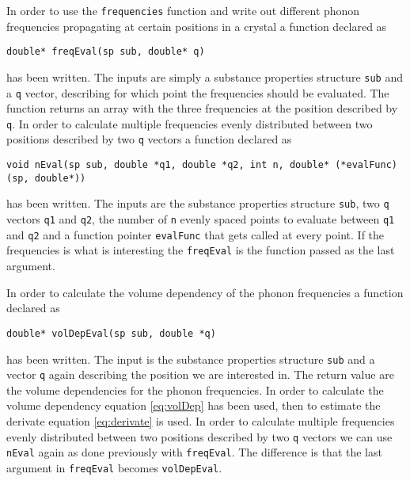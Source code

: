\documentclass[11pt]{article}
\begin{document}
In order to use the \verb+frequencies+ function and write out different phonon frequencies propagating at certain positions in a crystal a function declared as 
\begin{lstlisting}
double* freqEval(sp sub, double* q)
\end{lstlisting} 
has been written. The inputs are simply a substance properties structure \verb+sub+ and a \verb+q+ vector, describing for which point the frequencies should be evaluated. The function returns an array with the three frequencies at the position described by \verb+q+. In order to calculate multiple frequencies evenly distributed between two positions described by two \verb+q+ vectors a function declared as 
\begin{lstlisting}
void nEval(sp sub, double *q1, double *q2, int n, double* (*evalFunc)(sp, double*))
\end{lstlisting}
has been written. The inputs are the substance properties structure \verb+sub+, two \verb+q+ vectors \verb+q1+ and \verb+q2+, the number of \verb+n+ evenly spaced points to evaluate between \verb+q1+ and \verb+q2+ and a function pointer 
\verb+evalFunc+ that gets called at every point. If the frequencies is what is interesting the \verb+freqEval+ is the function passed as the last argument.


In order to calculate the volume dependency of the phonon frequencies a function declared as
\begin{lstlisting}
double* volDepEval(sp sub, double *q)
\end{lstlisting} 
has been written. The input is the substance properties structure \verb+sub+ and a vector \verb+q+ again describing the position we are interested in. The return value are the volume dependencies for the phonon frequencies. In order to calculate the volume dependency equation \ref{eq:volDep} has been used, then to estimate the derivate equation \ref{eq:derivate} is used. In order to calculate multiple frequencies evenly distributed between two positions described by two \verb+q+ vectors we can use \verb+nEval+ again as done previously with \verb+freqEval+. The difference is that the last argument in \verb+freqEval+ becomes \verb+volDepEval+.
\end{document}
